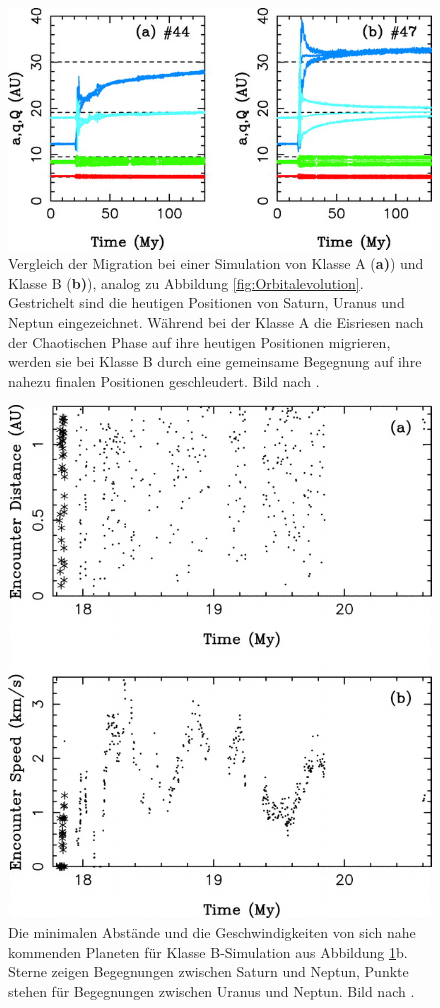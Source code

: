 \documentclass[12pt,a4paper,twoside]{article}
\renewcommand{\cite}{\citep}
\begin{document}
\begin{figure}[tbn]
\centering
\includegraphics[scale=2]{img/Nesvorny2007-1.jpg}
\caption{Vergleich der Migration bei einer Simulation von Klasse A (\textbf{a)}) und Klasse B (\textbf{b)}), analog zu Abbildung \ref{fig:Orbitalevolution}. Gestrichelt sind die heutigen Positionen von Saturn, Uranus und Neptun eingezeichnet. Während bei der Klasse A die Eisriesen nach der Chaotischen Phase auf ihre heutigen Positionen migrieren, werden sie bei Klasse B durch eine gemeinsame Begegnung auf ihre nahezu finalen Positionen geschleudert. Bild nach \cite{Nesvorny2007}.}
\label{fig:Orbitalevolution_vergleich}
\end{figure}
\begin{figure}[tbn]
\centering
\includegraphics[scale=0.4]{img/Nesvorny2007-2.png}
\caption{Die minimalen Abstände und die Geschwindigkeiten von sich nahe kommenden Planeten für Klasse B-Simulation aus Abbildung \ref{fig:Orbitalevolution_vergleich}b. Sterne zeigen Begegnungen zwischen Saturn und Neptun, Punkte stehen für Begegnungen zwischen Uranus und Neptun. Bild nach \cite{Nesvorny2007}.}
\label{fig:Begegnungen}
\end{figure}
\end{document}
